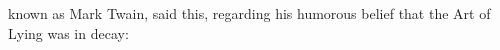 \documentclass{novelette}
\begin{document}
\begin{opening}
\null\null\null\null\null\null
{}
\null\null\null\null\null
\end{opening}
 known as Mark Twain, said this, regarding
his humorous belief that the Art of Lying was in decay:\par

\fillertext
\end{document}
